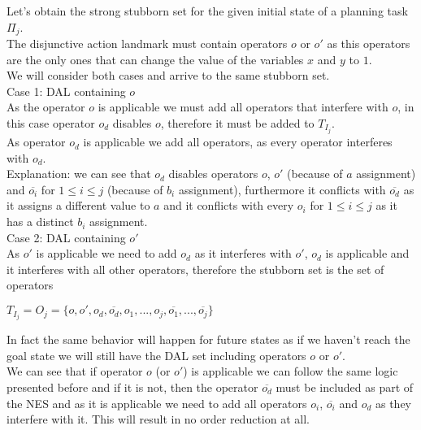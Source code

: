 \documentclass[11pt,a4paper]{article}
\begin{document}
Let's obtain the strong stubborn set for the given initial state of a planning task $\Pi_j$.\\
The disjunctive action landmark must contain operators $o$ or $o'$ as this operators are the only ones that can change the value of the variables $x$ and $y$ to $1$.\\
We will consider both cases and arrive to the same stubborn set.\\
Case 1: DAL containing ${o}$\\
As the operator $o$ is applicable we must add all operators that interfere with $o$, in this case operator $o_d$ disables $o$, therefore it must be added to $T_{I_j}$.\\
As operator $o_d$ is applicable we add all operators, as every operator interferes with $o_d$.\\
Explanation: we can see that $o_d$ disables operators $o$, $o'$ (because of $a$ assignment) and $\overline{o_i}$ for $1 \leq i \leq j$ (because of $b_i$ assignment), furthermore it conflicts with $\overline{o_d}$ as it assigns a different value to $a$ and it conflicts with every $o_i$ for $1 \leq i \leq j$ as it has a distinct $b_i$ assignment.\\
Case 2: DAL containing ${o'}$\\
As $o'$ is applicable we need to add $o_d$ as it interferes with $o'$, $o_d$ is applicable and it interferes with all other operators, therefore the stubborn set is the set of operators
\begin{center}
	$T_{I_j} = O_j = \{o, o', o_d, \overline{o_d}, o_1, ..., o_j, \overline{o_1}, ...,\overline{o_j}\}$
\end{center}

In fact the same behavior will happen for future states as if we haven't reach the goal state we will still have the DAL set including operators $o$ or $o'$. \\
We can see that if operator $o$ (or $o'$) is applicable we can follow the same logic presented before and if it is not, then the operator $\overline{o_d}$ must be included as part of the NES and as it is applicable we need to add all operators $o_i$, $\overline{o_i}$ and $o_d$ as they interfere with it. This will result in no order reduction at all.\\\\
\end{document}
